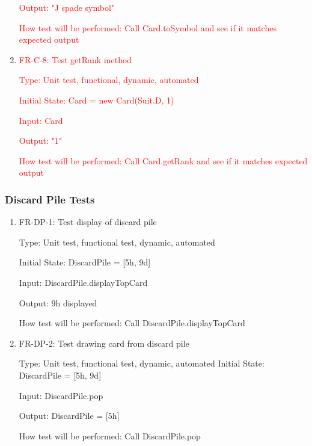 \documentclass[12pt, titlepage]{article}
\begin{document}
\begin{enumerate}
    \textcolor{red}{Output: "J spade symbol"}
    					
    \textcolor{red}{How test will be performed: Call Card.toSymbol and see if it matches expected output}
    
     \item \textcolor{red}{FR-C-8: Test getRank method}
    
    \textcolor{red}{Type: Unit test, functional, dynamic, automated}
    					
    \textcolor{red}{Initial State: Card  = new Card(Suit.D, 1)}
    					
    \textcolor{red}{Input:  Card}
    					
    \textcolor{red}{Output: "1"}
    					
    \textcolor{red}{How test will be performed: Call Card.getRank and see if it matches expected output}

\end{enumerate}

\subsubsection{Discard Pile Tests}
\begin{enumerate}
    \item{FR-DP-1: Test display of discard pile}
    
    Type: Unit test, functional test, dynamic, automated 
    					
    Initial State: DiscardPile = [5h, 9d]
    
    Input: DiscardPile.displayTopCard
    
    Output: 9h displayed
    					
    How test will be performed: Call DiscardPile.displayTopCard
    
    \item{FR-DP-2: Test drawing card from discard pile}
    
    Type: Unit test, functional test, dynamic, automated 
    Initial State: DiscardPile = [5h, 9d]

    Input: DiscardPile.pop
        
    Output: DiscardPile = [5h]
    					
    How test will be performed: Call DiscardPile.pop
\end{enumerate}
\end{document}
